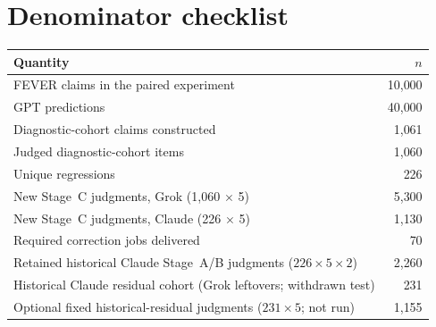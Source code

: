 \section{Denominator checklist}
\label{app:denoms}

\begin{tabular}{lr}
\toprule
Quantity & $n$ \\
\midrule
FEVER claims in the paired experiment & 10{,}000 \\
GPT predictions & 40{,}000 \\
Diagnostic-cohort claims constructed & 1{,}061 \\
Judged diagnostic-cohort items & 1{,}060 \\
Unique regressions & 226 \\
New Stage~C judgments, Grok (1{,}060 $\times$ 5) & 5{,}300 \\
New Stage~C judgments, Claude (226 $\times$ 5) & 1{,}130 \\
Required correction jobs delivered & 70 \\
Retained historical Claude Stage~A/B judgments ($226 \times 5 \times 2$) & 2{,}260 \\
Historical Claude residual cohort (Grok leftovers; withdrawn test) & 231 \\
Optional fixed historical-residual judgments ($231 \times 5$; not run) & 1{,}155 \\
\bottomrule
\end{tabular}
